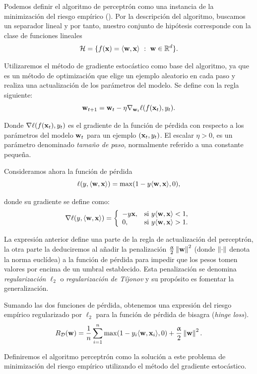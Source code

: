 \documentclass[oneside,openright,titlepage,numbers=noenddot,openany,headinclude,footinclude=true,
cleardoublepage=empty,abstractoff,BCOR=5mm,paper=a4,fontsize=12pt,main=spanish]{scrreprt}
\begin{document}
Podemos definir el algoritmo de perceptrón como una instancia de la minimización del riesgo empírico (\cite{fairnesslearning2019}). Por la descripción del algoritmo, buscamos un separador lineal y por tanto, nuestro conjunto de hipótesis corresponde con la clase de funciones lineales $$\mathcal H = \{ f(\textbf{x}) = \langle \textbf{w},\textbf{x} \rangle \ : \ \textbf{w} \in \mathbb R^d \}.$$

Utilizaremos el método de gradiente estocástico como base del algoritmo, ya que es un método de optimización que elige un ejemplo aleatorio en cada paso y realiza una actualización de los parámetros del modelo. Se define con la regla siguiente: $$\textbf{w}_{t+1}=\textbf{w}_t-\eta \nabla_{\textbf{w}_t} \ell (f(\textbf{x}_t),y_t).$$

Donde $\nabla \ell (f(\textbf{x}_t),y_t)$ es el gradiente de la función de pérdida con respecto a los parámetros del modelo $\textbf{w}_t$ para un ejemplo $(\textbf{x}_t,y_t)$. El escalar $\eta > 0$, es un parámetro denominado \textit{tamaño de paso}, normalmente referido a una constante pequeña.

Consideramos ahora la función de pérdida $$\ell(y,\langle \textbf{w},\textbf{x} \rangle)=\max (1-y\langle \textbf{w},\textbf{x} \rangle,0),$$

donde su gradiente se define como: $$\nabla \ell (y,\langle \textbf{w},\textbf{x} \rangle)=\left \{
\begin{array}{l l}
-y\textbf{x}, & \mbox{si } y\langle \textbf{w},\textbf{x} \rangle < 1, \\
0, & \mbox{si } y\langle \textbf{w},\textbf{x} \rangle > 1.
\end{array}
\right.$$

La expresión anterior define una parte de la regla de actualización del perceptrón, la otra parte la deduciremos al añadir la penalización $\frac{\upalpha}{2}\left\lVert\textbf{w}\right\rVert^2$ (donde $\left\lVert\cdot\right\rVert$ denota la norma euclídea) a la función de pérdida para impedir que los pesos tomen valores por encima de un umbral establecido. Esta penalización se denomina \textit{regularización $\ell_2$} o \textit{regularización de Tíjonov} y su propósito es fomentar la generalización.

Sumando las dos funciones de pérdida, obtenemos una expresión del riesgo empírico regularizado por $\ell_2$ para la función de pérdida de bisagra (\textit{hinge loss}). $$R_{\mathcal{D}}(\textbf{w})=\frac{1}{n}\sum_{i=1}^n \max (1-y_i\langle \textbf{w},\textbf{x}_i \rangle,0)+\frac{\upalpha}{2}\left\lVert\textbf{w}\right\rVert^2.$$

Definiremos el algoritmo perceptrón como la solución a este problema de minimización del riesgo empírico utilizando el método del gradiente estocástico.
\end{document}

